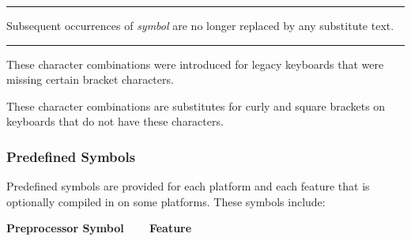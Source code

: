 \bigskip\hrule\vspace{0.1cm}

\noindent
{}Subsequent occurrences of \textit{symbol} are no longer
replaced by any substitute text.

\bigskip\hrule\vspace{0.1cm}

\noindent
These character combinations were introduced for legacy keyboards that
were missing certain bracket characters.


These character combinations are substitutes for curly and square
brackets on keyboards that do not have these characters.

\subsubsection{Predefined Symbols}

Predefined symbols are provided for each
platform and each feature that is optionally compiled in on some
platforms. These symbols include:

{\bfseries
Preprocessor Symbol\ \ \ \ Feature}

